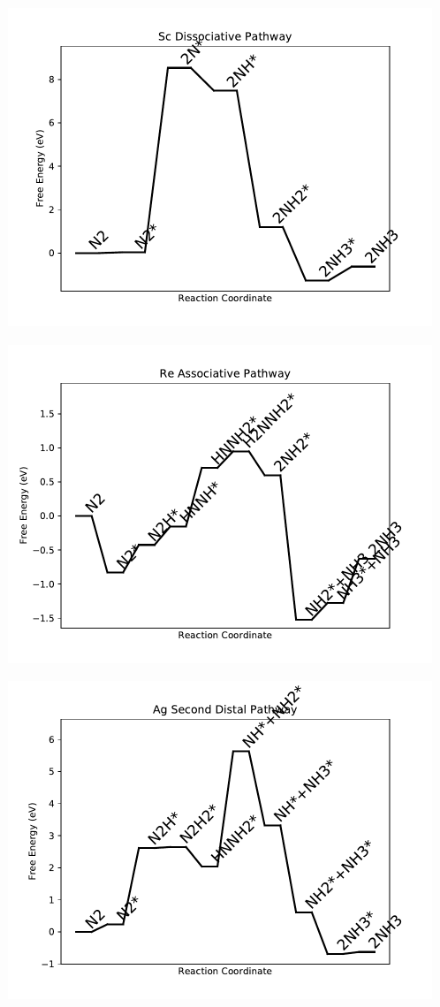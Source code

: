 \begin{figure}
\includegraphics[width=0.8\linewidth]{data/plots/Sc_dissociative.pdf}
\end{figure}

\begin{figure}
\includegraphics[width=0.8\linewidth]{data/plots/Re_associative.pdf}
\end{figure}

\begin{figure}
\includegraphics[width=0.8\linewidth]{data/plots/Ag_distal_2.pdf}
\end{figure}

